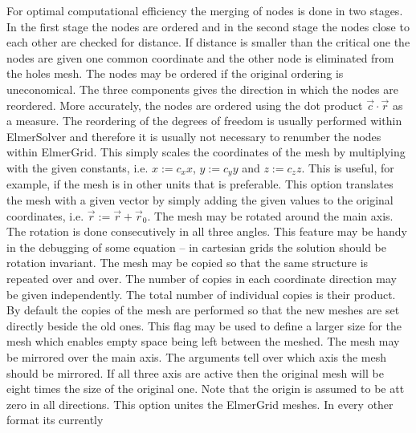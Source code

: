 For optimal computational efficiency the merging of nodes is done 
in two stages. In the first stage the nodes are ordered and in the second
stage the nodes close to each other are checked for distance. 
If distance is smaller than the critical one the nodes are given one
common coordinate and the other node is eliminated from the holes mesh.
%
The nodes may be ordered if the original ordering is uneconomical.
The three components gives the direction in which the nodes are reordered.
More accurately, the nodes are ordered using the 
dot product $\vec{c}\cdot\vec{r}$ as a measure.
%
The reordering of the degrees of freedom is usually performed 
within ElmerSolver and therefore 
it is usually not necessary to renumber the nodes within ElmerGrid.
%
%
This simply scales the coordinates of the mesh by 
multiplying with the given constants, i.e.
$x:=c_x x$, $y:=c_y y$ and $z:=c_z z$.
This is useful, for example, if the mesh is in other units that is 
preferable. 
%
This option translates the mesh with a given vector by
simply adding the given values to the original coordinates,
i.e. $\vec{r} := \vec{r} + \vec{r}_0$.
%
The mesh may be rotated around the main axis. 
The rotation is done consecutively in all three angles.
This feature may be handy in the debugging of some equation --
in cartesian grids the solution should be rotation invariant.
%
The mesh may be copied so that the same 
structure is repeated over and over. The number of copies in 
each coordinate direction may be given independently.
The total number of individual copies is their product.
%
By default the copies of the mesh are performed so that the 
new meshes are set directly beside the old ones. This flag may be used to define
a larger size for the mesh which enables empty space being left 
between the meshed.
%
The mesh may be mirrored over the main axis. The arguments 
tell over which axis the mesh should be mirrored. If all three axis
are active then the original mesh will be eight times the size of the original one.
Note that the origin is assumed to be att zero in all directions.
%
This option unites the ElmerGrid meshes. In every other format its currently
